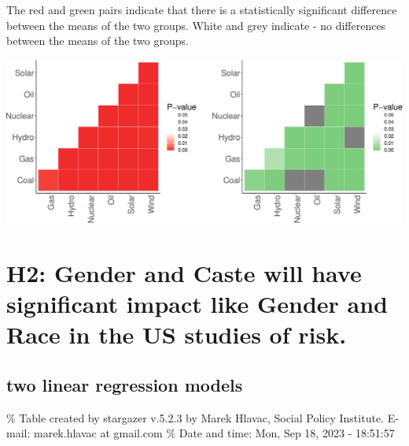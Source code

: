 \documentclass[
]{article}
\begin{document}
The red and green pairs indicate that there is a statistically
significant difference between the means of the two groups. White and
grey indicate - no differences between the means of the two groups.

\includegraphics{Paper1_files/figure-latex/unnamed-chunk-9-1.pdf}

\newpage

\hypertarget{h2-gender-and-caste-will-have-significant-impact-like-gender-and-race-in-the-us-studies-of-risk.}{%
\section{H2: Gender and Caste will have significant impact like Gender
and Race in the US studies of
risk.}\label{h2-gender-and-caste-will-have-significant-impact-like-gender-and-race-in-the-us-studies-of-risk.}}

\hypertarget{two-linear-regression-models}{%
\subsection{two linear regression
models}\label{two-linear-regression-models}}

\begingroup\setlength{\tabcolsep}{1pt}\renewcommand{\arraystretch}{0.7}

\% Table created by stargazer v.5.2.3 by Marek Hlavac, Social Policy
Institute. E-mail: marek.hlavac at gmail.com \% Date and time: Mon, Sep
18, 2023 - 18:51:57
\end{document}
